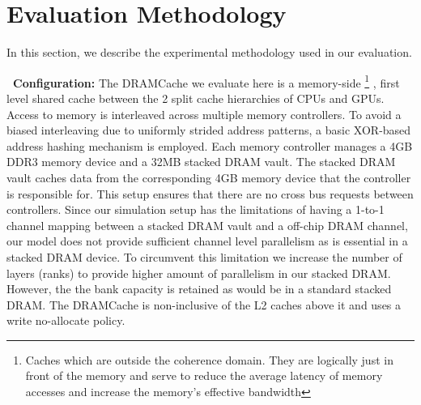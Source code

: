 \section{Evaluation Methodology} \label{methodology}
In this section, we describe the experimental methodology used in our evaluation. 

\par \textbf{\cachename\ Configuration:} The DRAMCache we evaluate here is a memory-side \footnote{Caches which are outside the coherence domain. They are logically just in front of the memory and serve to reduce the average latency of memory accesses and increase the memory's effective bandwidth}  \cite{skylake}, 
first level shared cache between the 2 split cache hierarchies of CPUs and GPUs. Access to memory is interleaved across multiple memory controllers. To avoid a biased interleaving due to uniformly strided address patterns, a basic XOR-based address hashing mechanism is employed. Each memory controller manages a 4GB DDR3 memory device and a 32MB stacked DRAM vault. The stacked DRAM vault caches data from the corresponding 4GB memory device that the controller is responsible for. This setup ensures that there are no cross bus requests between controllers. Since our simulation setup has the limitations of having a 1-to-1 channel mapping between a stacked DRAM vault and a off-chip DRAM channel, our model does not provide sufficient channel level parallelism as is essential in a stacked DRAM device. To circumvent this limitation we increase the number of layers (ranks) to provide higher amount of parallelism in our stacked DRAM. However, the the bank capacity is retained as would be in a standard stacked DRAM. The DRAMCache is non-inclusive  \cite{coherence-dramcache} of the L2 caches above it and uses a write no-allocate policy.

